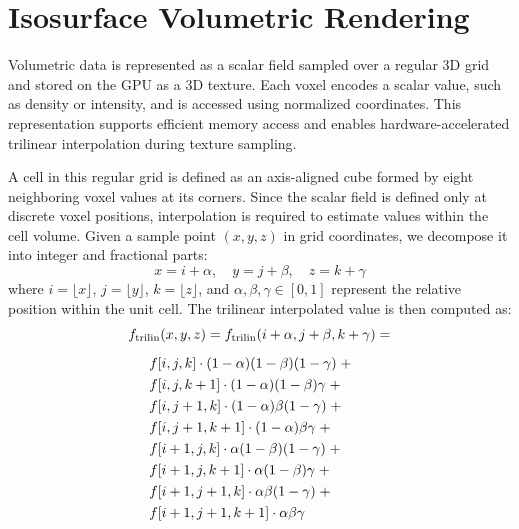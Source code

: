 \documentclass[conference]{IEEEtran}
\begin{document}
\section{Isosurface Volumetric Rendering}

Volumetric data is represented as a scalar field sampled over a regular 3D grid and stored on the GPU as a 3D texture. Each voxel encodes a scalar value, such as density or intensity, and is accessed using normalized coordinates. This representation supports efficient memory access and enables hardware-accelerated trilinear interpolation during texture sampling.

A cell in this regular grid is defined as an axis-aligned cube formed by eight neighboring voxel values at its corners. Since the scalar field is defined only at discrete voxel positions, interpolation is required to estimate values within the cell volume. Given a sample point \((x, y, z)\) in grid coordinates, we decompose it into integer and fractional parts:
\[
x = i + \alpha, \quad y = j + \beta, \quad z = k + \gamma
\]
where \(i = \lfloor x \rfloor\), \(j = \lfloor y \rfloor\), \(k = \lfloor z \rfloor\), and \(\alpha, \beta, \gamma \in [0, 1]\) represent the relative position within the unit cell. The trilinear interpolated value is then computed as:
\begin{equation}
\begin{array}{l}
f_{\text{trilin}}(x, y, z) = f_{\text{trilin}}(i + \alpha, j + \beta, k + \gamma) =\\[2ex]
\hspace{1.5em} f[i, j, k] \cdot (1 - \alpha)(1 - \beta)(1 - \gamma) \; +\\[0.75ex]
\hspace{1.5em} f[i, j, k+1] \cdot (1 - \alpha)(1 - \beta)\gamma \; +\\[0.75ex]
\hspace{1.5em} f[i, j+1, k] \cdot (1 - \alpha)\beta(1 - \gamma) \; +\\[0.75ex]
\hspace{1.5em} f[i, j+1, k+1] \cdot (1 - \alpha)\beta\gamma \; +\\[0.75ex]
\hspace{1.5em} f[i+1, j, k] \cdot \alpha(1 - \beta)(1 - \gamma) \; +\\[0.75ex]
\hspace{1.5em} f[i+1, j, k+1] \cdot \alpha(1 - \beta)\gamma \; +\\[0.75ex]
\hspace{1.5em} f[i+1, j+1, k] \cdot \alpha\beta(1 - \gamma) \; +\\[0.75ex]
\hspace{1.5em} f[i+1, j+1, k+1] \cdot \alpha\beta\gamma
\end{array}
\end{equation}
\end{document}
